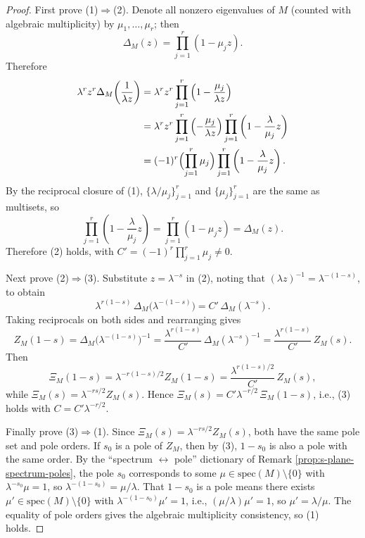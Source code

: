 \begin{proof}
First prove (1)\(\Rightarrow\)(2). Denote all nonzero eigenvalues of \(M\) (counted with algebraic multiplicity) by \(\mu_1,\dots,\mu_r\); then
\[
\Delta_M(z)=\prod_{j=1}^{r}(1-\mu_j z).
\]
Therefore
\[
\begin{aligned}
\lambda^r z^r\Delta_M\!\left(\frac{1}{\lambda z}\right)
&=\lambda^r z^r\prod_{j=1}^r\left(1-\frac{\mu_j}{\lambda z}\right)
\\
&=\lambda^r z^r\prod_{j=1}^r\left(-\frac{\mu_j}{\lambda z}\right)\prod_{j=1}^r\left(1-\frac{\lambda}{\mu_j}z\right)
\\
&=(-1)^r\Bigl(\prod_{j=1}^r\mu_j\Bigr)\prod_{j=1}^r\left(1-\frac{\lambda}{\mu_j}z\right).
\end{aligned}
\]
By the reciprocal closure of (1), \(\{\lambda/\mu_j\}_{j=1}^r\) and \(\{\mu_j\}_{j=1}^r\) are the same as multisets, so
\[
\prod_{j=1}^r\left(1-\frac{\lambda}{\mu_j}z\right)=\prod_{j=1}^r(1-\mu_j z)=\Delta_M(z).
\]
Therefore (2) holds, with \(C'=(-1)^r\prod_{j=1}^r\mu_j\neq 0\).
\par
Next prove (2)\(\Rightarrow\)(3). Substitute \(z=\lambda^{-s}\) in (2), noting that
\(
(\lambda z)^{-1}=\lambda^{-(1-s)}
\), to obtain
\[
\lambda^{r(1-s)}\,\Delta_M\!\bigl(\lambda^{-(1-s)}\bigr)=C'\,\Delta_M(\lambda^{-s}).
\]
Taking reciprocals on both sides and rearranging gives
\[
Z_M(1-s)=\Delta_M\!\bigl(\lambda^{-(1-s)}\bigr)^{-1}=\frac{\lambda^{r(1-s)}}{C'}\,\Delta_M(\lambda^{-s})^{-1}=\frac{\lambda^{r(1-s)}}{C'}\,Z_M(s).
\]
Then
\[
\Xi_M(1-s)
=\lambda^{-r(1-s)/2}Z_M(1-s)
=\frac{\lambda^{r(1-s)/2}}{C'}\,Z_M(s),
\]
while
\(
\Xi_M(s)=\lambda^{-rs/2}Z_M(s)
\).
Hence
\(
\Xi_M(s)=C'\lambda^{-r/2}\,\Xi_M(1-s)
\), i.e., (3) holds with \(C=C'\lambda^{-r/2}\).
\par
Finally prove (3)\(\Rightarrow\)(1). Since \(\Xi_M(s)=\lambda^{-rs/2}Z_M(s)\), both have the same pole set and pole orders.
If \(s_0\) is a pole of \(Z_M\), then by (3), \(1-s_0\) is also a pole with the same order.
By the ``spectrum \(\leftrightarrow\) pole'' dictionary of Remark \ref{prop:s-plane-spectrum-poles},
the pole \(s_0\) corresponds to some \(\mu\in\mathrm{spec}(M)\setminus\{0\}\) with \(\lambda^{-s_0}\mu=1\), so \(\lambda^{-(1-s_0)}=\mu/\lambda\).
That \(1-s_0\) is a pole means there exists \(\mu'\in\mathrm{spec}(M)\setminus\{0\}\) with \(\lambda^{-(1-s_0)}\mu'=1\), i.e., \((\mu/\lambda)\mu'=1\), so \(\mu'=\lambda/\mu\).
The equality of pole orders gives the algebraic multiplicity consistency, so (1) holds.
\end{proof}

